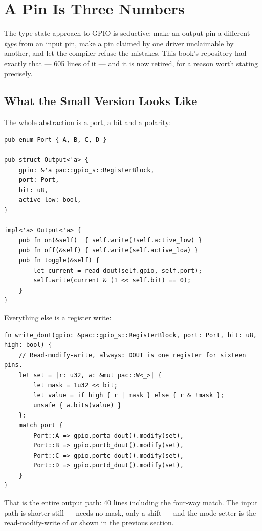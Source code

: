 \section{A Pin Is Three Numbers}
\label{sec:pin-three-numbers}

The type-state approach to GPIO is seductive: make an output pin a different \emph{type} from an
input pin, make a pin claimed by one driver unclaimable by another, and let the compiler refuse the
mistakes. This book's repository had exactly that — 605 lines of it — and it is now retired, for a
reason worth stating precisely.

\subsection{What the Small Version Looks Like}

The whole abstraction is a port, a bit and a polarity:

\begin{verbatim}
pub enum Port { A, B, C, D }

pub struct Output<'a> {
    gpio: &'a pac::gpio_s::RegisterBlock,
    port: Port,
    bit: u8,
    active_low: bool,
}

impl<'a> Output<'a> {
    pub fn on(&self)  { self.write(!self.active_low) }
    pub fn off(&self) { self.write(self.active_low) }
    pub fn toggle(&self) {
        let current = read_dout(self.gpio, self.port);
        self.write(current & (1 << self.bit) == 0);
    }
}
\end{verbatim}

Everything else is a register write:

\begin{verbatim}
fn write_dout(gpio: &pac::gpio_s::RegisterBlock, port: Port, bit: u8, high: bool) {
    // Read-modify-write, always: DOUT is one register for sixteen pins.
    let set = |r: u32, w: &mut pac::W<_>| {
        let mask = 1u32 << bit;
        let value = if high { r | mask } else { r & !mask };
        unsafe { w.bits(value) }
    };
    match port {
        Port::A => gpio.porta_dout().modify(set),
        Port::B => gpio.portb_dout().modify(set),
        Port::C => gpio.portc_dout().modify(set),
        Port::D => gpio.portd_dout().modify(set),
    }
}
\end{verbatim}

That is the entire output path: 40 lines including the four-way match. The input path is shorter
still —  needs no mask, only a shift — and the mode setter is the read-modify-write
of  or  shown in the previous section.


